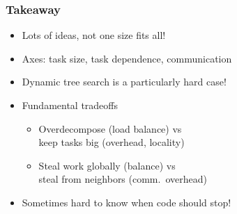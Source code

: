 \documentclass{beamer}
\begin{document}
\begin{frame}
  \frametitle{Takeaway}

  \begin{itemize}
  \item Lots of ideas, not one size fits all!
  \item Axes: task size, task dependence, communication
  \item Dynamic tree search is a particularly hard case!
  \item Fundamental tradeoffs
    \begin{itemize}
    \item Overdecompose (load balance) vs \\
      keep tasks big (overhead, locality)
    \item Steal work globally (balance) vs \\
      steal from neighbors (comm.~overhead)
    \end{itemize}
  \item Sometimes hard to know when code should stop!
  \end{itemize}
\end{frame}
\end{document}
